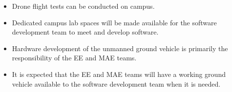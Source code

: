 

\begin{itemize}
  \item Drone flight tests can be conducted on campus.
  \item Dedicated campus lab spaces will be made available for the software development team to meet and develop software.
  \item Hardware development of the unmanned ground vehicle is primarily the responsibility of the EE and MAE teams.
  \item It is expected that the EE and MAE teams will have a working ground vehicle available to the software development team when it is needed.
\end{itemize}